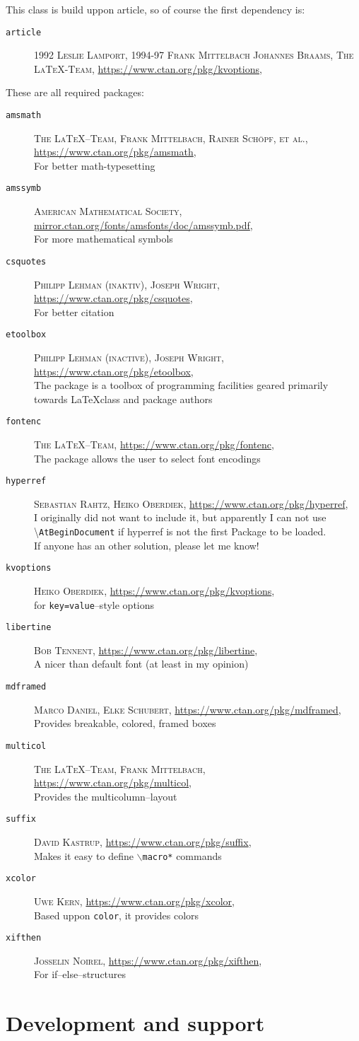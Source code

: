 \documentclass[a4paper,landscape,columns=3]{cheatsheet}
\begin{document}
This class is build uppon \textrm{article}, so of course the first
dependency is:
\newcommand{\dep}[4]{\item[\texttt{#1}]\textsc{#2}, \url{#3},\\#4}{}
\begin{description}
	\dep{article}{1992 Leslie Lamport, 1994-97 Frank Mittelbach
		Johannes Braams, The \LaTeX-Team}{https://www.ctan.org/pkg/kvoptions}
\end{description}
These are all required packages:
\begin{description}
	\dep{amsmath}{The \LaTeX--Team, Frank Mittelbach, Rainer Sch\"opf, et
		al.}{https://www.ctan.org/pkg/amsmath}{For better math-typesetting}
	\dep{amssymb}{American Mathematical
		Society}{mirror.ctan.org/fonts/amsfonts/doc/amssymb.pdf}{For more
		mathematical symbols}
	\dep{csquotes}{Philipp Lehman (inaktiv), Joseph
		Wright}{https://www.ctan.org/pkg/csquotes}{For better citation}
	\dep{etoolbox}{Philipp Lehman (inactive), Joseph
		Wright}{https://www.ctan.org/pkg/etoolbox}{The package is a toolbox
		of programming facilities geared primarily towards \LaTeX class and
		package authors}
	\dep{fontenc}{The
		\LaTeX{}--Team}{https://www.ctan.org/pkg/fontenc}{The package
		allows the user to select font encodings}
	\dep{hyperref}{Sebastian Rahtz, Heiko
		Oberdiek}{https://www.ctan.org/pkg/hyperref}{I originally did not
		want to include it, but apparently I can not use
		\textbackslash\lstinline{AtBeginDocument} if hyperref is not the
		first Package to be loaded.\\
		If anyone has an other solution, please let me know!}
	\dep{kvoptions}{Heiko Oberdiek}{https://www.ctan.org/pkg/kvoptions}{for
		\texttt{key=value}--style options}
	\dep{libertine}{Bob Tennent}{https://www.ctan.org/pkg/libertine}{ A
		nicer than default font (at least in my opinion)}
	\dep{mdframed}{Marco Daniel, Elke
		Schubert}{https://www.ctan.org/pkg/mdframed}{Provides breakable,
		colored, framed boxes}
	\dep{multicol}{The \LaTeX--Team, Frank
		Mittelbach}{https://www.ctan.org/pkg/multicol}{Provides the
		multicolumn--layout}
	\dep{suffix}{David Kastrup}{https://www.ctan.org/pkg/suffix}{Makes
		it easy to define \texttt{$\backslash$macro*} commands}
	\dep{xcolor}{Uwe Kern}{https://www.ctan.org/pkg/xcolor}{Based uppon
		\lstinline{color}, it provides colors}
	\dep{xifthen}{Josselin Noirel}{https://www.ctan.org/pkg/xifthen}{For
		if--else--structures}
\end{description}
\section{Development and support}
\end{document}
